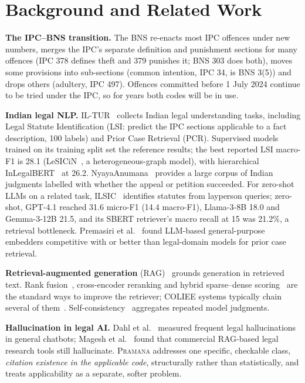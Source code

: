 \documentclass[conference]{IEEEtran}
\newcommand{\sys}{\textsc{Pramana}\xspace}
\begin{document}
\section{Background and Related Work}
\textbf{The IPC--BNS transition.} The BNS re-enacts most IPC offences under new numbers, merges the IPC's separate definition and punishment sections for many offences (IPC 378 defines theft and 379 punishes it; BNS 303 does both), moves some provisions into sub-sections (common intention, IPC 34, is BNS 3(5)) and drops others (adultery, IPC 497). Offences committed before 1 July 2024 continue to be tried under the IPC, so for years both codes will be in use.

\textbf{Indian legal NLP.} IL-TUR~\cite{iltur} collects Indian legal understanding tasks, including Legal Statute Identification (LSI: predict the IPC sections applicable to a fact description, 100 labels) and Prior Case Retrieval (PCR). Supervised models trained on its training split set the reference results; the best reported LSI macro-F1 is 28.1 (LeSICiN~\cite{lesicin}, a heterogeneous-graph model), with hierarchical InLegalBERT~\cite{inlegalbert} at 26.2. NyayaAnumana~\cite{nyaya} provides a large corpus of Indian judgments labelled with whether the appeal or petition succeeded. For zero-shot LLMs on a related task, ILSIC~\cite{ilsic} identifies statutes from layperson queries; zero-shot, GPT-4.1 reached 31.6 micro-F1 (14.4 macro-F1), Llama-3-8B 18.0 and Gemma-3-12B 21.5, and its SBERT retriever's macro recall at 15 was 21.2\%, a retrieval bottleneck. Premasiri et al.~\cite{pcrembed} found LLM-based general-purpose embedders competitive with or better than legal-domain models for prior case retrieval.

\textbf{Retrieval-augmented generation} (RAG)~\cite{rag} grounds generation in retrieved text. Rank fusion~\cite{rrf}, cross-encoder reranking and hybrid sparse--dense scoring~\cite{bgem3} are the standard ways to improve the retriever; COLIEE systems typically chain several of them~\cite{coliee2025}. Self-consistency~\cite{selfconsistency} aggregates repeated model judgments.

\textbf{Hallucination in legal AI.} Dahl et al.~\cite{dahl2024} measured frequent legal hallucinations in general chatbots; Magesh et al.~\cite{magesh2024} found that commercial RAG-based legal research tools still hallucinate. \sys addresses one specific, checkable class, \emph{citation existence in the applicable code}, structurally rather than statistically, and treats applicability as a separate, softer problem.
\end{document}
